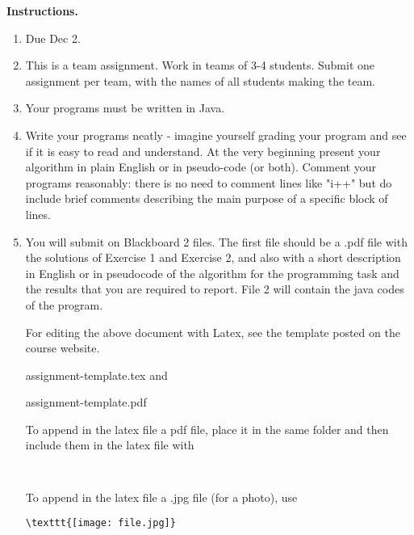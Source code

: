 \documentclass[11pt]{article}
\begin{document}
\vline

\textbf{Instructions.}
\begin{enumerate}
\item Due  Dec 2.



\item This is a team assignment. Work in teams of 3-4 students.  Submit one assignment per team, with the names of all students making the team.


\item Your programs must be written in Java.

\item Write your programs neatly - imagine yourself grading your program and see if it is easy to read and understand. 
At the very beginning present your algorithm in plain English or in pseudo-code (or both).
Comment your programs reasonably: there is no need to comment lines like "i++" but do include brief comments describing the main purpose of a specific block of lines.

\item  You will submit on Blackboard 2 files. The first file should be a .pdf file  with the solutions of  Exercise  1 and Exercise  2,  and also with  a short description  in English or in pseudocode of the algorithm  for the  programming task  and the results that you are required to report. File 2 will contain the java codes of the program.







For editing the above document with  Latex, see the template posted on the course website. 
 
           assignment-template.tex	and
           
          assignment-template.pdf


To append in the  latex file  a pdf file, place it  in the same folder and then include them  in the latex file with 
\begin{verbatim}


\end{verbatim}
To append in the  latex file a .jpg file (for a photo), use 
\begin{verbatim}
\texttt{[image: file.jpg]}

\end{verbatim}


\end{enumerate}
\end{document}
